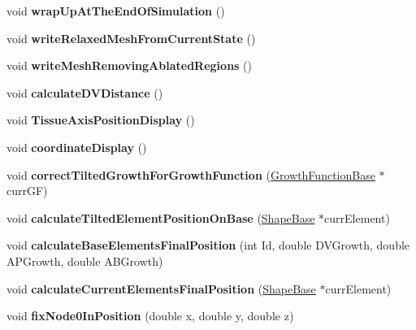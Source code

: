 \begin{DoxyCompactItemize}
\item 
\hypertarget{classSimulation_ada1776f97a899b0e77e20df658713cb3}{}void {\bfseries wrap\+Up\+At\+The\+End\+Of\+Simulation} ()\label{classSimulation_ada1776f97a899b0e77e20df658713cb3}

\item 
\hypertarget{classSimulation_ac6cb6f4e1f7060527ead71c2ce83727d}{}void {\bfseries write\+Relaxed\+Mesh\+From\+Current\+State} ()\label{classSimulation_ac6cb6f4e1f7060527ead71c2ce83727d}

\item 
\hypertarget{classSimulation_a1e990cd49b78fbe08f5e594c71872ac4}{}void {\bfseries write\+Mesh\+Removing\+Ablated\+Regions} ()\label{classSimulation_a1e990cd49b78fbe08f5e594c71872ac4}

\item 
\hypertarget{classSimulation_a2cdf77d01390a32cabb8ba7535a9f7dd}{}void {\bfseries calculate\+D\+V\+Distance} ()\label{classSimulation_a2cdf77d01390a32cabb8ba7535a9f7dd}

\item 
\hypertarget{classSimulation_abb87948e7b8131fd5d747bf728232db2}{}void {\bfseries Tissue\+Axis\+Position\+Display} ()\label{classSimulation_abb87948e7b8131fd5d747bf728232db2}

\item 
\hypertarget{classSimulation_a1d49a9ab3e83456d86ec5bfcf0d1a804}{}void {\bfseries coordinate\+Display} ()\label{classSimulation_a1d49a9ab3e83456d86ec5bfcf0d1a804}

\item 
\hypertarget{classSimulation_a3b25df63c54a058e6917309aed483e6e}{}void {\bfseries correct\+Tilted\+Growth\+For\+Growth\+Function} (\hyperlink{classGrowthFunctionBase}{Growth\+Function\+Base} $\ast$curr\+G\+F)\label{classSimulation_a3b25df63c54a058e6917309aed483e6e}

\item 
\hypertarget{classSimulation_acbe2603b1eb8b50978f9f1d30f87311c}{}void {\bfseries calculate\+Tilted\+Element\+Position\+On\+Base} (\hyperlink{classShapeBase}{Shape\+Base} $\ast$curr\+Element)\label{classSimulation_acbe2603b1eb8b50978f9f1d30f87311c}

\item 
\hypertarget{classSimulation_aa6e3525243aaf17afe95dc5bd97a124a}{}void {\bfseries calculate\+Base\+Elements\+Final\+Position} (int Id, double D\+V\+Growth, double A\+P\+Growth, double A\+B\+Growth)\label{classSimulation_aa6e3525243aaf17afe95dc5bd97a124a}

\item 
\hypertarget{classSimulation_af6f6e9ee39d12e91957d934a2f1711f9}{}void {\bfseries calculate\+Current\+Elements\+Final\+Position} (\hyperlink{classShapeBase}{Shape\+Base} $\ast$curr\+Element)\label{classSimulation_af6f6e9ee39d12e91957d934a2f1711f9}

\item 
\hypertarget{classSimulation_a4897adef943963c8f79f45fcc52e409a}{}void {\bfseries fix\+Node0\+In\+Position} (double x, double y, double z)\label{classSimulation_a4897adef943963c8f79f45fcc52e409a}

\end{DoxyCompactItemize}
